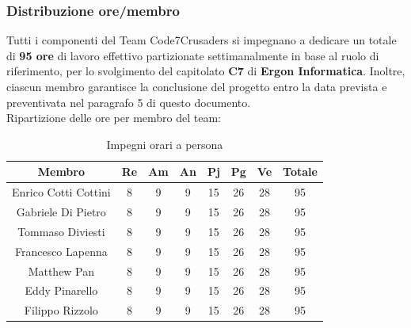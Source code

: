 \documentclass{article}
\begin{document}
        \subsubsection{Distribuzione ore/membro}
        Tutti i componenti del Team Code7Crusaders si impegnano a dedicare un totale di \textbf{95 ore} di lavoro effettivo partizionate 
        settimanalmente in base al ruolo di riferimento, per lo svolgimento del capitolato \textbf{C7} di \textbf{Ergon Informatica}. Inoltre,
        ciascun membro garantisce la conclusione del progetto entro la data prevista e preventivata nel paragrafo 5 di questo documento.
        \\
        Ripartizione delle ore per membro del team:
        \begin{table}[!h]
            \begin{center}
                \begin{tabular}{ |c|c|c|c|c|c|c|c| }
                    \hline
                    \textbf{Membro}    & \textbf{Re} & \textbf{Am} & \textbf{An} & \textbf{Pj} & \textbf{Pg} & \textbf{Ve} & \textbf{Totale} \\
                    \hline
                    Enrico Cotti Cottini     & 8           & 9           & 9          & 15          & 26          & 28          & 95              \\
                    Gabriele Di Pietro       & 8           & 9           & 9          & 15          & 26          & 28          & 95              \\
                    Tommaso Diviesti         & 8           & 9           & 9          & 15          & 26          & 28          & 95              \\
                    Francesco Lapenna        & 8           & 9           & 9          & 15          & 26          & 28          & 95              \\
                    Matthew Pan              & 8           & 9           & 9          & 15          & 26          & 28          & 95              \\
                    Eddy Pinarello           & 8           & 9           & 9          & 15          & 26          & 28          & 95              \\
                    Filippo Rizzolo          & 8           & 9           & 9          & 15          & 26          & 28          & 95              \\
                    \hline
                \end{tabular}
                \caption{Impegni orari a persona} 
            \end{center}
        \end{table}
\end{document}
